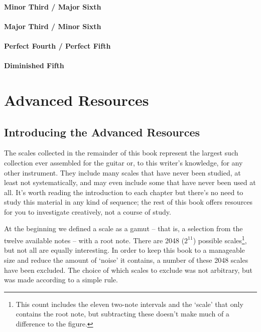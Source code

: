 \documentclass[english]{./gbook}
\newcommand{\titlebreak}{}
\begin{document}
\begin{large}
\subsection*{Minor Third / Major Sixth}

\subsection*{Major Third / Minor Sixth}

\subsection*{Perfect Fourth / Perfect Fifth}

\subsection*{Diminished Fifth}













\part{Advanced Resources}

\chapter{\mbox{Introducing} \mbox{the} \titlebreak \mbox{Advanced} \mbox{Resources}}

The scales collected in the remainder of this book represent the largest such collection ever assembled for the guitar or, to this writer's knowledge, for any other instrument. They include many scales that have never been studied, at least not systematically, and may even include some that have never been used at all. It's worth reading the introduction to each chapter but there's no need to study this material in any kind of sequence; the rest of this book offers resources for you to investigate creatively, not a course of study.

At the beginning we defined a scale as a gamut -- that is, a selection from the twelve available notes -- with a root note. There are 2048 ($2^{11}$) possible scales\footnote{This count includes the eleven two-note intervals and the `scale' that only contains the root note, but subtracting these doesn't make much of a difference to the figure.}, but not all are equally interesting. In order to keep this book to a manageable size and reduce the amount of `noise' it contains, a number of these 2048 scales have been excluded. The choice of which scales to exclude was not arbitrary, but was made according to a simple rule.


\end{large}
\end{document}

